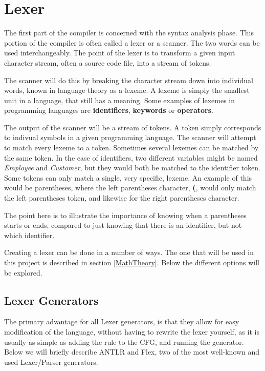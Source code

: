 \section{Lexer}
The first part of the compiler is concerned with the syntax analysis phase.
This portion of the compiler is often called a lexer or a scanner.
The two words can be used interchangeably. 
The point of the lexer is to transform a given input character stream, often a source code file, into a stream of tokens.

The scanner will do this by breaking the character stream down into individual words, known in language theory as a lexeme.
A lexeme is simply the smallest unit in a language, that still has a meaning.
Some examples of lexemes in programming languages are \textbf{identifiers}, \textbf{keywords} or \textbf{operators}.

The output of the scanner will be a stream of tokens.
A token simply corresponds to indivual symbols in a given programming language.
The scanner will attempt to match every lexeme to a token.
Sometimes several lexemes can be matched by the same token.
In the case of identifiers, two different variables might be named \textit{Employee} and \textit{Customer}, but they would both be matched to the identifier token.
Some tokens can only match a single, very specific, lexeme.
An example of this would be parentheses, where the left parentheses character, \textbf{(}, would only match the left parentheses token, and likewise for the right parentheses character.

The point here is to illustrate the importance of knowing when a parentheses starts or ends, compared to just knowing that there is an identifier, but not which identifier.


Creating a lexer can be done in a number of ways.
The one that will be used in this project is described in section \ref{MathTheory}.
Below the different options will be explored.
\subsection{Lexer Generators}
The primary advantage for all Lexer generators, is that they allow for easy modification of the language, without having to  rewrite the lexer yourself, as it is usually as simple as adding the rule to the CFG, and running the generator.
Below we will briefly describe ANTLR and Flex, two of the most well-known and used Lexer/Parser generators.

